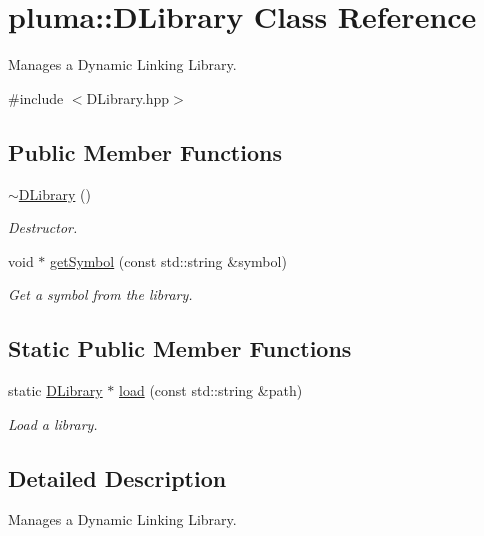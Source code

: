 \hypertarget{classpluma_1_1_d_library}{}\section{pluma\+:\+:D\+Library Class Reference}
\label{classpluma_1_1_d_library}


Manages a Dynamic Linking Library.  




{\ttfamily \#include $<$D\+Library.\+hpp$>$}

\subsection*{Public Member Functions}
\begin{DoxyCompactItemize}
\item 
\hyperlink{classpluma_1_1_d_library_a3fa679bc824b36ce61b67716bedd15c7}{$\sim$\+D\+Library} ()
\begin{DoxyCompactList}\small\item\em Destructor. \end{DoxyCompactList}\item 
void $\ast$ \hyperlink{classpluma_1_1_d_library_a57dd3726140cce08957e40cb5b001d84}{get\+Symbol} (const std\+::string \&symbol)
\begin{DoxyCompactList}\small\item\em Get a symbol from the library. \end{DoxyCompactList}\end{DoxyCompactItemize}
\subsection*{Static Public Member Functions}
\begin{DoxyCompactItemize}
\item 
static \hyperlink{classpluma_1_1_d_library}{D\+Library} $\ast$ \hyperlink{classpluma_1_1_d_library_a32400d8e50c0f03cb525ca7500b4516e}{load} (const std\+::string \&path)
\begin{DoxyCompactList}\small\item\em Load a library. \end{DoxyCompactList}\end{DoxyCompactItemize}


\subsection{Detailed Description}
Manages a Dynamic Linking Library. 

